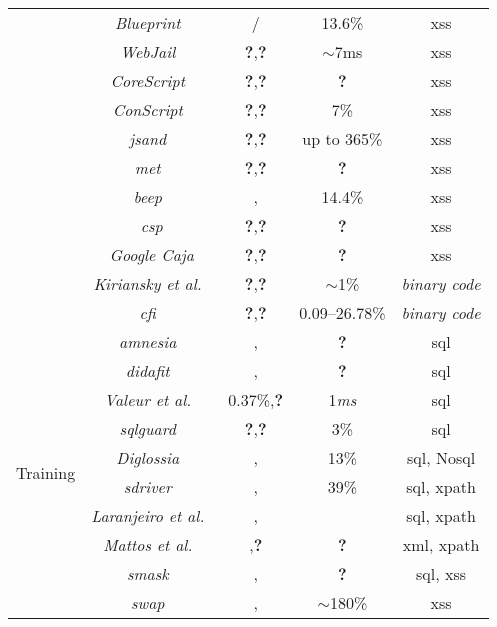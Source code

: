 \documentclass[conference]{IEEEtran}
\newcommand{\tick}{\ding{52}}
\newcommand{\xmark}{\ding{56}}
\begin{document}
\begin{table*}
\begin{threeparttable}
\begin{small}
{\begin{tabular}{l|c|cc|c}
	&  {\it Blueprint}~\cite{LV09} & \tick/\tick & 13.6\% & {\sc xss} \\ 
	&  {\it WebJail}~\cite{VDDPJ11} & {\bf ?},{\bf ?} & $\sim$7ms & {\sc xss} \\ 
	&  {\it CoreScript}~\cite{YCIS07} & {\bf ?},{\bf ?} &  {\bf ?} & {\sc xss} \\ 
	&  {\it ConScript}~\cite{ML10} & {\bf ?},{\bf ?} & 7\% & {\sc xss} \\
	&  {\it {\sc js}and}~\cite{AVBPDP12} & {\bf ?},{\bf ?} & up to 365\% & {\sc xss}\\
	&  {\it {\sc met}}~\cite{ELX07} & {\bf ?},{\bf ?} &  {\bf ?} & {\sc xss} \\ 
    &  {\it {\sc beep}}~\cite{TNH07}  & \tick,\tick & 14.4\% & {\sc xss} \\
	&  {\it {\sc csp}} & {\bf ?},{\bf ?} & {\bf ?} & {\sc xss} \\ 
    &  {\it Google Caja} & {\bf ?},{\bf ?} & {\bf ?} & {\sc xss} \\
	&  {\it Kiriansky et al.~\cite{KBA02}} & {\bf ?},{\bf ?} & $\sim$1\% & {\it binary code} \\
	& {\it {\sc cfi}~\cite{ABEL05}} & {\bf ?},{\bf ?} & 0.09--26.78\% & {\it binary code} \\
	\hline
	\hline  
        \multirow{12}{*}{Training}
	&   {\it {\sc amnesia}}~\cite{HO05,HO06,HO05b} & \tick,\tick & {\bf ?} & {\sc sql} \\ 
	&   {\it {\sc didafit}}~\cite{LLW02} & \xmark,\xmark & {\bf ?} & {\sc sql} \\
	&   {\it Valeur et al.}~\cite{VMV05} & 0.37\%,{\bf ?} & 1{\it ms} & {\sc sql} \\
	& 	{\it {\sc sqlg}uard}~\cite{BWS05} & {\bf ?},{\bf ?} & 3\% & {\sc sql} \\
	& 	{\it Diglossia}~\cite{SMS13} & \xmark,\xmark  & 13\% & {\sc sql}, No{\sc sql} \\
	& 	{\it {\sc sd}river}~\cite{MS09,MKS09} & \tick,\tick & 39\% & {\sc sql}, {\sc xp}ath \\
	& 	{\it Laranjeiro et al.}~\cite{LVM09,ALVM09,LVM10} & \xmark,\xmark  & \xmark & {\sc sql}, {\sc xp}ath \\
	& 	{\it Mattos et al.}~\cite{MSM13} & \tick,{\bf ?} &  {\bf ?} & {\sc xml}, {\sc xp}ath \\
	& 	{\it {\sc sm}ask}~\cite{JB07} & \xmark,\xmark & {\bf ?} & {\sc sql}, {\sc xss} \\
	& 	{\it {\sc swap}}~\cite{WPLKK09} & \tick,\tick & $\sim$180\% & {\sc xss} \\ 

\end{tabular}}
\end{small}
\end{threeparttable}
\end{table*}
\end{document}
